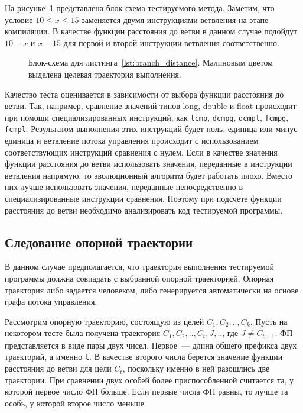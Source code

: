 На рисунке~\ref{branch_distance} представлена блок-схема тестируемого метода. Заметим, что условие $10 \le x \le 15$ заменяется двумя инструкциями ветвления на 
этапе компиляции. В качестве функции расстояния до ветви в данном случае подойдут $10 - x$ и $x - 15$ для первой и второй инструкции ветвления соответственно. 

\begin{figure}[h!]
  \caption{Блок-схема для листинга~\ref{lst:branch_distance}. Малиновым цветом выделена целевая траектория выполнения.}
  \label{branch_distance}
\end{figure}

Качество теста оценивается в зависимости от выбора функции расстояния до ветви. Так, например, сравнение значений типов long, double и float происходит при 
помощи специализированных инструкций, как \texttt{lcmp},  \texttt{dcmpg}, \texttt{dcmpl}, \texttt{fcmpg}, \texttt{fcmpl}. Результатом выполнения этих 
инструкций будет ноль, единица или минус единица и ветвление потока управления происходит с использованием соответствующих инструкций сравнения с нулем. Если в 
качестве значения функции расстояния до ветви использовать значения, переданные в инструкции ветвления напрямую, то эволюционный алгоритм будет работать плохо. 
Вместо них лучше использовать значения, переданные непосредственно в специализированные инструкции сравнения. Поэтому при подсчете функции расстояния до ветви 
необходимо анализировать код тестируемой программы.

\subsection{Следование опорной траектории}
\label{sec:track_based_fitness}
В данном случае предполагается, что траектория выполнения тестируемой программы должна совпадать с выбранной опорной траекторией. Опорная траектория либо 
задается человеком, либо генерируется автоматически на основе графа потока управления.

Рассмотрим опорную траекторию, состоящую из целей $C_1,C_2,..,C_k$. Пусть на некотором тесте была получена траектория $C_1,C_2,..,C_t,J,..$, где $J \neq 
C_{t+1}$. ФП представляется в виде пары двух чисел. Первое~--- длина общего префикса двух траекторий, а именно \texttt{t}. В качестве второго числа берется 
значение функции расстояния до ветви для цели $C_t$, поскольку именно в ней разошлись две траектории. При сравнении двух особей более приспособленной считается 
та, у которой первое число ФП больше. Если первые числа ФП равны, то лучше та особь, у которой второе число меньше.

